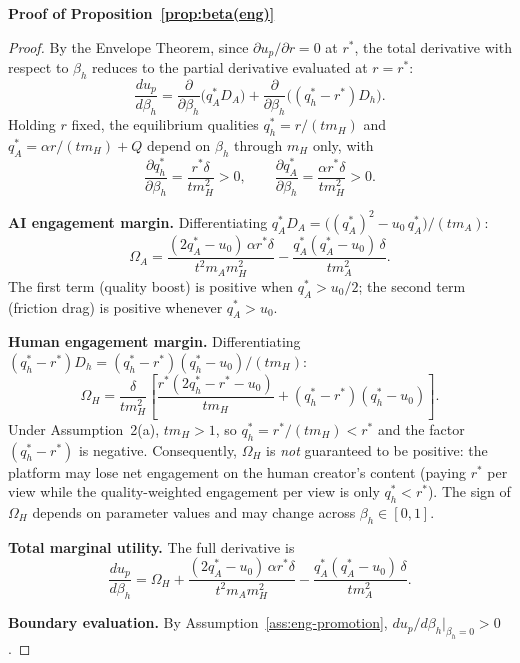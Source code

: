 \documentclass[mnsc,nonblindrev]{informs3_NoOR}
\begin{document}
\noindent\textbf{Proof of Proposition~\ref{prop:beta(eng)}}
\begin{proof}
By the Envelope Theorem, since $\partial u_p/\partial r = 0$ at $r^*$, the total derivative with respect to $\beta_h$ reduces to the partial derivative evaluated at $r = r^*$:
\[
\frac{du_p}{d\beta_h} = \frac{\partial}{\partial \beta_h}\bigl(q_A^* D_A\bigr) + \frac{\partial}{\partial \beta_h}\bigl((q_h^* - r^*) D_h\bigr).
\]
Holding $r$ fixed, the equilibrium qualities $q_h^* = r/(tm_H)$ and $q_A^* = \alpha r/(tm_H) + Q$ depend on $\beta_h$ through $m_H$ only, with
\[
\frac{\partial q_h^*}{\partial \beta_h} = \frac{r^*\delta}{tm_H^2} > 0, \qquad \frac{\partial q_A^*}{\partial \beta_h} = \frac{\alpha r^*\delta}{tm_H^2} > 0.
\]
 
\medskip\noindent\textbf{AI engagement margin.}
Differentiating $q_A^* D_A = \bigl((q_A^*)^2 - u_0\,q_A^*\bigr)/(tm_A)$:
\[
\Omega_A = \frac{(2q_A^* - u_0)\,\alpha r^*\delta}{t^2 m_A m_H^2} - \frac{q_A^*(q_A^* - u_0)\,\delta}{tm_A^2}.
\]
The first term (quality boost) is positive when $q_A^* > u_0/2$; the second term (friction drag) is positive whenever $q_A^* > u_0$.
 
\medskip\noindent\textbf{Human engagement margin.}
Differentiating $(q_h^* - r^*) D_h = (q_h^* - r^*)(q_h^* - u_0)/(tm_H)$:
\[
\Omega_H = \frac{\delta}{tm_H^2}\!\left[\frac{r^*(2q_h^* - r^* - u_0)}{tm_H} + (q_h^* - r^*)(q_h^* - u_0)\right].
\]
Under Assumption~2(a), $tm_H > 1$, so $q_h^* = r^*/(tm_H) < r^*$ and the factor $(q_h^* - r^*)$ is negative. Consequently, $\Omega_H$ is \emph{not} guaranteed to be positive: the platform may lose net engagement on the human creator's content (paying $r^*$ per view while the quality-weighted engagement per view is only $q_h^* < r^*$). The sign of $\Omega_H$ depends on parameter values and may change across $\beta_h \in [0,1]$.
 
\medskip\noindent\textbf{Total marginal utility.}
The full derivative is
\begin{equation}\label{eq:full-deriv}
\frac{du_p}{d\beta_h} = \Omega_H + \frac{(2q_A^* - u_0)\,\alpha r^*\delta}{t^2 m_A m_H^2} - \frac{q_A^*(q_A^* - u_0)\,\delta}{tm_A^2}.
\end{equation}
 
\medskip\noindent\textbf{Boundary evaluation.}
By Assumption~\ref{ass:eng-promotion}, $du_p/d\beta_h\big|_{\beta_h = 0} > 0$.
 

\end{proof}
\end{document}

